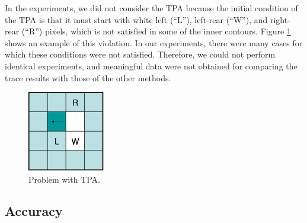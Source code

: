 
In the experiments, we did not consider the TPA because the initial condition of the TPA \cite{Ghuneim2015Contour,Pavlidis2012Algorithms} is that it must start with white left (``L''), left-rear (``W''), and right-rear (``R'') pixels, which is not satisfied in some of the inner contours. Figure \ref{fig:image15} shows an example of this violation. In our experiments, there were many cases for which these conditions were not satisfied. Therefore, we could not perform identical experiments, and meaningful data were not obtained for comparing the trace results with those of the other methods. 

\begin{figure}[htbp]
	\centering
	\includegraphics[width=0.3\textwidth]{5.ExperimentalResult/fig15.png}
	\caption{Problem with TPA.}
	\label{fig:image15}
\end{figure}

\subsection{Accuracy}

